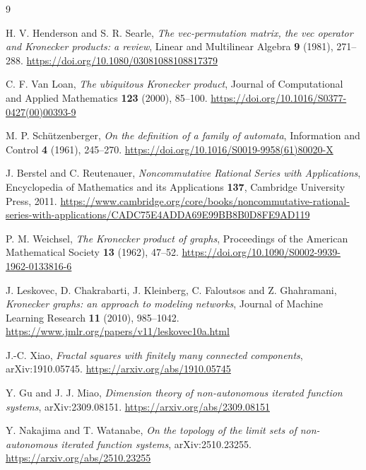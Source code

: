 \documentclass[11pt]{amsart}
\theoremstyle{definition}
\theoremstyle{remark}
\begin{document}
\begin{thebibliography}{9}

H. V. Henderson and S. R. Searle, \emph{The vec-permutation matrix, the vec operator and Kronecker products: a review}, Linear and Multilinear Algebra \textbf{9} (1981), 271--288. \url{https://doi.org/10.1080/03081088108817379}

C. F. Van Loan, \emph{The ubiquitous Kronecker product}, Journal of Computational and Applied Mathematics \textbf{123} (2000), 85--100. \url{https://doi.org/10.1016/S0377-0427(00)00393-9}

M. P. Sch\"utzenberger, \emph{On the definition of a family of automata}, Information and Control \textbf{4} (1961), 245--270. \url{https://doi.org/10.1016/S0019-9958(61)80020-X}

J. Berstel and C. Reutenauer, \emph{Noncommutative Rational Series with Applications}, Encyclopedia of Mathematics and its Applications \textbf{137}, Cambridge University Press, 2011. \url{https://www.cambridge.org/core/books/noncommutative-rational-series-with-applications/CADC75E4ADDA69E99BB8B0D8FE9AD119}

P. M. Weichsel, \emph{The Kronecker product of graphs}, Proceedings of the American Mathematical Society \textbf{13} (1962), 47--52. \url{https://doi.org/10.1090/S0002-9939-1962-0133816-6}

J. Leskovec, D. Chakrabarti, J. Kleinberg, C. Faloutsos and Z. Ghahramani, \emph{Kronecker graphs: an approach to modeling networks}, Journal of Machine Learning Research \textbf{11} (2010), 985--1042. \url{https://www.jmlr.org/papers/v11/leskovec10a.html}

J.-C. Xiao, \emph{Fractal squares with finitely many connected components}, arXiv:1910.05745. \url{https://arxiv.org/abs/1910.05745}

Y. Gu and J. J. Miao, \emph{Dimension theory of non-autonomous iterated function systems}, arXiv:2309.08151. \url{https://arxiv.org/abs/2309.08151}

Y. Nakajima and T. Watanabe, \emph{On the topology of the limit sets of non-autonomous iterated function systems}, arXiv:2510.23255. \url{https://arxiv.org/abs/2510.23255}

\end{thebibliography}
\end{document}
